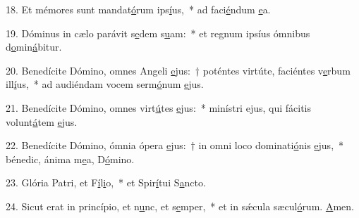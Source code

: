 18. Et mémores sunt mandat\uline{ó}rum ips\uline{í}us,~* ad faci\uline{é}ndum \uline{e}a.\par 
19. Dóminus in cælo parávit s\uline{e}dem s\uline{u}am:~* et regnum ipsíus ómnibus d\uline{o}min\uline{á}bitur.\par 
20. Benedícite Dómino, omnes Angeli \uline{e}jus:~† poténtes virtúte, faciéntes v\uline{e}rbum ill\uline{í}us,~* ad audiéndam vocem serm\uline{ó}num \uline{e}jus.\par 
21. Benedícite Dómino, omnes virt\uline{ú}tes \uline{e}jus:~* minístri ejus, qui fácitis volunt\uline{á}tem \uline{e}jus.\par 
22. Benedícite Dómino, ómnia ópera \uline{e}jus:~† in omni loco dominati\uline{ó}nis \uline{e}jus,~* bénedic, ánima m\uline{e}a, D\uline{ó}mino.\par 
23. Glória Patri, et F\uline{í}l\uline{i}o,~* et Spir\uline{í}tui S\uline{a}ncto.\par 
24. Sicut erat in princípio, et n\uline{u}nc, et s\uline{e}mper,~* et in sǽcula sæcul\uline{ó}rum. \uline{A}men.\par 
